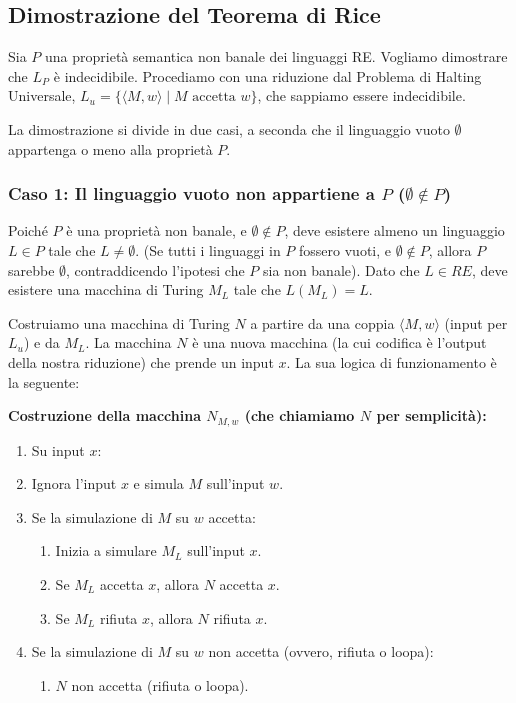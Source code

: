 \documentclass[a4paper, 11pt]{book} %
\theoremstyle{definition}
\begin{document}
\subsection{Dimostrazione del Teorema di Rice}
Sia $P$ una proprietà semantica non banale dei linguaggi RE. Vogliamo dimostrare che $L_P$ è indecidibile. Procediamo con una riduzione dal Problema di Halting Universale, $L_u = \{\langle M,w \rangle \mid M \text{ accetta } w\}$, che sappiamo essere indecidibile.

La dimostrazione si divide in due casi, a seconda che il linguaggio vuoto $\emptyset$ appartenga o meno alla proprietà $P$.

\subsubsection{Caso 1: Il linguaggio vuoto non appartiene a $P$ ($\emptyset \notin P$)}
Poiché $P$ è una proprietà non banale, e $\emptyset \notin P$, deve esistere almeno un linguaggio $L \in P$ tale che $L \neq \emptyset$. (Se tutti i linguaggi in $P$ fossero vuoti, e $\emptyset \notin P$, allora $P$ sarebbe $\emptyset$, contraddicendo l'ipotesi che $P$ sia non banale).
Dato che $L \in RE$, deve esistere una macchina di Turing $M_L$ tale che $L(M_L) = L$.

Costruiamo una macchina di Turing $N$ a partire da una coppia $\langle M,w \rangle$ (input per $L_u$) e da $M_L$. La macchina $N$ è una nuova macchina (la cui codifica è l'output della nostra riduzione) che prende un input $x$. La sua logica di funzionamento è la seguente:

\textbf{Costruzione della macchina $N_{M,w}$ (che chiamiamo $N$ per semplicità):}
\begin{enumerate}
    \item Su input $x$:
    \item Ignora l'input $x$ e simula $M$ sull'input $w$.
    \item Se la simulazione di $M$ su $w$ accetta:
        \begin{enumerate}
            \item Inizia a simulare $M_L$ sull'input $x$.
            \item Se $M_L$ accetta $x$, allora $N$ accetta $x$.
            \item Se $M_L$ rifiuta $x$, allora $N$ rifiuta $x$.
        \end{enumerate}
    \item Se la simulazione di $M$ su $w$ non accetta (ovvero, rifiuta o loopa):
        \begin{enumerate}
            \item $N$ non accetta (rifiuta o loopa).
        \end{enumerate}
\end{enumerate}
\end{document}
